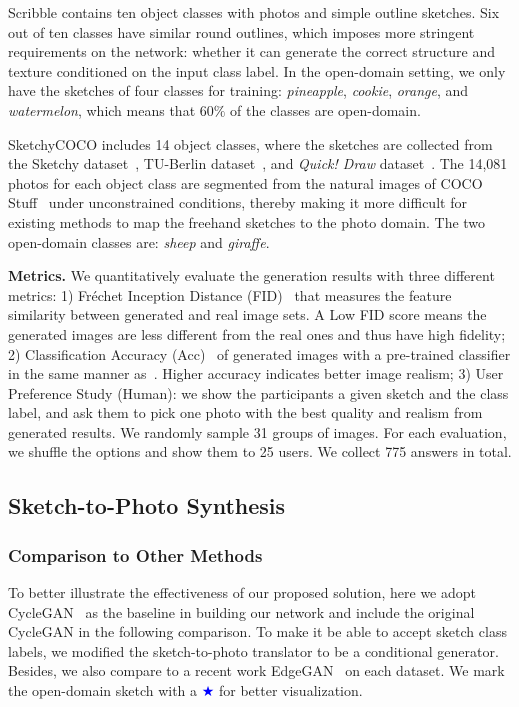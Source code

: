 \documentclass[10pt,twocolumn,letterpaper]{article}
\begin{document}
Scribble contains ten object classes with photos and simple outline sketches. Six out of ten classes have similar round outlines, which imposes more stringent requirements on the network: whether it can generate the correct structure and texture conditioned on the input class label. In the open-domain setting, we only have the sketches of four classes for training: \textit{pineapple}, \textit{cookie}, \textit{orange}, and \textit{watermelon}, which means that $60\%$ of the classes are open-domain. 



SketchyCOCO includes 14 object classes, where the sketches are collected from the Sketchy dataset~\cite{sangkloy2016sketchy}, TU-Berlin dataset~\cite{eitz2012humans}, and \textit{Quick! Draw} dataset~\cite{ha2017neural}. The 14,081 photos for each object class are segmented from the natural images of COCO Stuff~\cite{caesar2018coco} under unconstrained conditions, thereby making it more difficult for existing methods to map the freehand sketches to the photo domain. The two open-domain classes are: \textit{sheep} and \textit{giraffe}. 

\noindent \textbf{Metrics.} We quantitatively evaluate the generation results with three different metrics: 1) Fr\'{e}chet Inception Distance (FID)~\cite{heusel2017gans} that measures the feature similarity between generated and real image sets. A Low FID score means the generated images are less different from the real ones and thus have high fidelity; 2) Classification Accuracy (Acc)~\cite{ashual2019specifying} of generated images with a pre-trained classifier in the same manner as~\cite{ghosh2019interactive,gao2020sketchycoco}. Higher accuracy indicates better image realism; 3) User Preference Study (Human): we show the participants a given sketch and the class label, and ask them to pick one photo with the best quality and realism from generated results. We randomly sample 31 groups of images. For each evaluation, we shuffle the options and show them to 25 users. We collect 775 answers in total.

\subsection{Sketch-to-Photo Synthesis}
\subsubsection{Comparison to Other Methods}
\label{sec:exp_comp}
To better illustrate the effectiveness of our proposed solution, here we adopt CycleGAN~\cite{zhu2017unpaired} as the baseline in building our network and include the original CycleGAN in the following comparison. To make it be able to accept sketch class labels, we modified the sketch-to-photo translator to be a conditional generator. Besides, we also compare to a recent work EdgeGAN~\cite{gao2020sketchycoco} on each dataset. We mark the open-domain sketch with a \textcolor{blue}{$\bigstar$} for better visualization.
\end{document}
